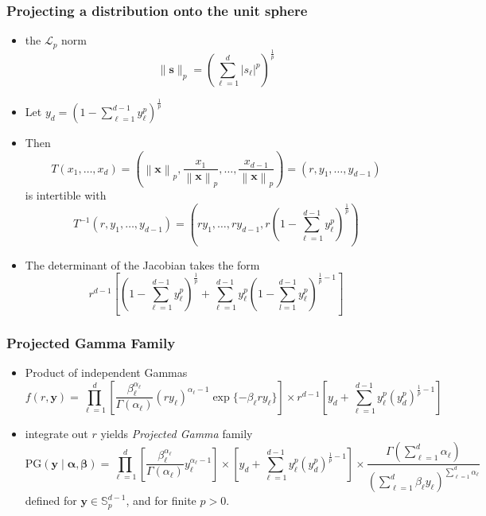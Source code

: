 \documentclass[aspectratio=169]{beamer}
\newcommand{\norm}[1]{\left\lVert #1 \right\rVert}
\newcommand{\pnorm}[2]{\norm{#1}_{#2}}
\begin{document}
\begin{frame}
  \frametitle{Projecting a distribution onto the unit sphere}
  \small
  \begin{itemize}
    \item the $\mathcal{L}_p$ norm \[
        \lVert \bm{s} \rVert_p = \left({\textstyle\sum}_{\ell = 1}^d
          \lvert s_{\ell}\rvert^p\right)^{\frac{1}{p}}
      \]
    \item Let $y_d = \left(1 - {\textstyle\sum}_{\ell = 1}^{d-
      1}y_{\ell}^p\right)^{\frac{1}{p}}$
    \item Then
      \[
        T(x_1,\ldots,x_d) = \left(\pnorm{\bm{x}}{p},
          \frac{x_1}{\pnorm{\bm{x}}{p}}, \ldots ,
          \frac{x_{d-1}}{\pnorm{\bm{x}}{p}}\right) = (r,y_1,\ldots,y_{d-1})
      \]
    is intertible with
      \[
        T^{-1}\left(r,y_1,\ldots,y_{d-1}\right) =
          \left(ry_1,\ldots,ry_{d-1}, r\left(1 -
            {\textstyle\sum}_{\ell = 1}^{d-
            1}y_{\ell}^p\right)^{\frac{1}{p}}\right)
      \]
    \item The determinant of the Jacobian takes the form
      \[
        r^{d-1}\left[\left(1 - {\textstyle\sum}_{\ell = 1}^{d
          -1}y_{\ell}^p\right)^{\frac{1}{p}} +
          {\textstyle\sum}_{\ell = 1}^{d-1}y_{\ell}^p\left(1 - {\textstyle\sum}_{l=1}^{d-1} y_{\ell}^p\right)^{\frac{1}{p} - 1}\right]
      \]
    \end{itemize}
\end{frame}

\begin{frame}
  \frametitle{Projected Gamma Family}
  \begin{itemize}
    \item Product of independent Gammas
      \[
        f(r,\bm{ y}) = \prod_{\ell = 1}^{d}
          \left[\frac{\beta_{\ell}^{\alpha_{\ell}}}{
            \Gamma(\alpha_{\ell})}(ry_{\ell})^{\alpha_{\ell} - 1}
            \exp\lbrace-\beta_{\ell}ry_{\ell}\rbrace\right]
        \times r^{d-1}\left[y_d +
              {\textstyle \sum}_{\ell = 1}^{d-1}y_{\ell}^p\left(y_d^p\right)^{\frac{1}{p} - 1}\right]
      \]
    \item integrate out $r$ yields \emph{Projected Gamma} family
      \[
        \text{PG}(\bm{ y}\mid\bm{ \alpha},\bm{ \beta}) =
            \prod_{\ell = 1}^d\left[
            \frac{\beta_{\ell}^{\alpha_{\ell}}}{\Gamma(\alpha_{\ell})}
                  y_{\ell}^{\alpha_{\ell} - 1}\right]
        \times \left[y_d +
            {\textstyle \sum}_{\ell = 1}^{d-
            1}y_{\ell}^p\left(y_d^p\right)^{\frac{1}{p} - 1}\right]
        \times \frac{\Gamma({\textstyle\sum}_{\ell =
         1}^d\alpha_{\ell})}{\left({\textstyle\sum}_{\ell = 1}^d
                      \beta_{\ell}y_{\ell}\right)^{{\scriptstyle\sum_{\ell =
                       1}^d \alpha_{\ell}}}}
      \]
      defined for $\bm{y}\in {\mathbb S}_p^{d-1}$, and for finite $p>0$.
  \end{itemize}
\end{frame}
\end{document}
